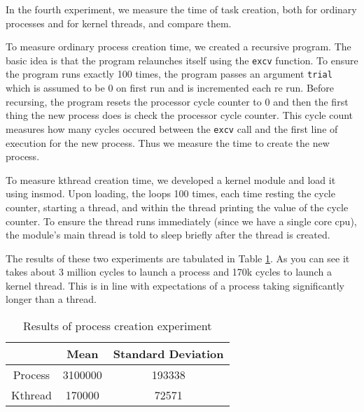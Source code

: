 In the fourth experiment, we measure the time of task creation, both for ordinary processes and for kernel threads, and compare them.

To measure ordinary process creation time, we created a recursive program.
The basic idea is that the program relaunches itself using the {\tt excv} function.  
To ensure the program runs exactly 100 times, the program passes an argument {\tt trial} which is assumed to be 0 on first run and is incremented each re run.
Before recursing, the program resets the processor cycle counter to 0 and then the first thing the new process does is check the processor cycle counter.
This cycle count measures how many cycles occured between the {\tt excv} call and the first line of execution for the new process.
Thus we measure the time to create the new process.

To measure kthread creation time, we developed a kernel module and load it using insmod.
Upon loading, the loops 100 times, each time resting the cycle counter, starting a thread, and within the thread printing the value of the cycle counter.
To ensure the thread runs immediately (since we have a single core cpu), the module's main thread is told to sleep briefly after the thread is created.

The results of these two experiments are tabulated in Table \ref{tab:exp1_4}.
As you can see it takes about 3 million cycles to launch a process and 170k cycles to launch a kernel thread.
This is in line with expectations of a process taking significantly longer than a thread.

\begin{table}
\begin{tabular}{|c|c|c|}\hline
& Mean & Standard Deviation \\\hline
Process &  3100000 & 193338 \\
Kthread & 170000 & 72571 \\\hline
\end{tabular}
\caption{Results of process creation experiment}\label{tab:exp1_4}
\end{table}